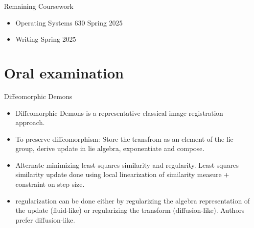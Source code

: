 \documentclass{beamer}
\begin{document}
\begin{frame}{Remaining Coursework}
        \begin{itemize}
            \item Operating Systems 630 Spring 2025
            \item Writing Spring 2025
        \end{itemize}
\end{frame}

\section{Oral examination}

\begin{frame}{Diffeomorphic Demons}
	\begin{itemize}
		\item Diffeomorphic Demons is a representative classical image registration approach.
		\item To preserve diffeomorphism: Store the transfrom as an element of the lie group, derive update in lie algebra, exponentiate and compose.
		\item Alternate minimizing least squares similarity and regularity. Least squares similarity update done using local linearization of similarity measure + constraint on step size.
		\item regularization can be done either by regularizing the algebra representation of the update (fluid-like) or regularizing the transform (diffusion-like). Authors prefer diffusion-like.

	\end{itemize}
\end{frame}
\end{document}
